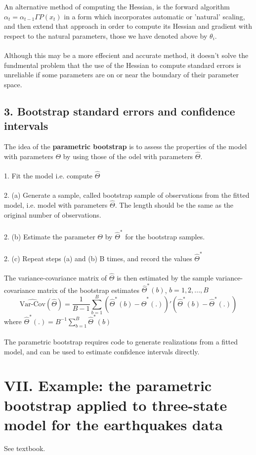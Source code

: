 \documentclass{article}
\begin{document}
An alternative method of computing the Hessian, is the forward algorithm $\alpha_t = \alpha_{t-1} \Gamma P(x_t)$ in a form which incorporates automatic or 'natural' scaling, and then extend that approach in order to compute its Hessian and gradient with respect to the natural parameters, those we have denoted above by $\theta_i$. \\
\\
Although this may be a more effecient and accurate method, it doesn't solve the fundmental problem that the use of the Hessian to compute standard errors is unreliable if some parameters are on or near the boundary of their parameter space.

\subsection*{3. Bootstrap standard errors and confidence intervals}
The idea of the \textbf{parametric bootstrap} is to assess the properties of the model with parameters $\Theta$ by using those of the odel with parameters $\hat{\Theta}$. \\
\\
1. Fit the model i.e. compute $\hat{\Theta}$ \\
\\
2. (a) Generate a sample, called bootstrap sample of observations from the fitted model, i.e. model with parameters $\hat{\Theta}$. The length should be the same as the original number of observations. \\
\\
2. (b) Estimate the parameter $\Theta$ by $\hat{\Theta}^*$ for the bootstrap samples. \\
\\
2. (c) Repeat steps (a) and (b) B times, and record the values $\hat{\Theta}^*$ \\
\\
The variance-covariance matrix of $\hat{\Theta}$ is then estimated by the sample variance-covariance matrix of the bootstrap estimates $\hat{\Theta}^*(b)$, $b = 1, 2, ..., B$
$$\hat{\text{Var-Cov}}(\hat{\Theta}) = \frac{1}{B-1} \sum_{b=1}^B (\hat{\Theta}^* (b) - \hat{\Theta}^* (.))' (\hat{\Theta}^* (b) - \hat{\Theta}^* (.))$$
where $\hat{\Theta}^*(.) = B^{-1} \sum_{b=1}^B \hat{\Theta}^* (b)$ \\
\\
The parametric bootstrap requires code to generate realizations from a fitted model, and can be used to estimate confidence intervals directly. 

\section*{VII. Example: the parametric bootstrap applied to three-state model for the earthquakes data}

See textbook.
\end{document}

